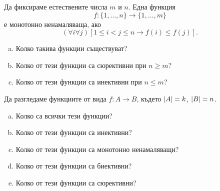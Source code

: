 \begin{problem}
  Да фиксираме естествените числа $m$ и $n$.
  Една функция \[f:\{1,\dots,n\}\to\{1,\dots,m\}\] е монотонно ненамаляваща, ако
  \[(\forall i\forall j)[1\leq i<j\leq n \rightarrow f(i)\leq f(j)].\]
  \begin{enumerate}[a)]
  \item
    Колко такива функции съществуват?
  \item
    Колко от тези функции са сюрективни при $n\geq m$?
  \item
    Колко от тези функции са инективни при $n\leq m$?
  \end{enumerate}
\end{problem}

\begin{problem}
  Да разгледаме функциите от вида $f:A\to B$,
  където $\lvert{A}\rvert = k$, $\lvert{B}\rvert = n$.
  \begin{enumerate}[a)]
  \item 
    Колко са всички тези функции?
  \item
    Колко от тези функции са инективни?
  \item
    Колко от тези функции са монотонно ненамаляващи?
  \item
    Колко от тези функции са биективни?
  \item
    Колко от тези функции са сюрективни?
  \end{enumerate}
\end{problem}


